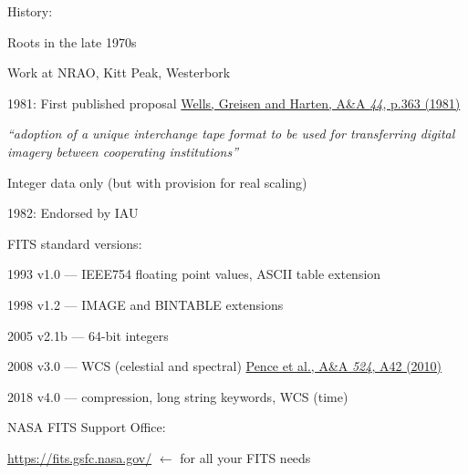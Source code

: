 \documentclass[20pt,landscape]{foils}
\newcommand{\bhref}[2]{\href{#1}{{\color{blue}#2}}}
\newcommand{\burl}[1]{{\color{blue}\url{#1}}}
\begin{document}
\begin{list0}
  \item History:
  \begin{list2big}
    \item Roots in the late 1970s
    \begin{list3}
      \item Work at NRAO, Kitt Peak, Westerbork
    \end{list3}
    \item 1981: First published proposal
          \bhref{https://ui.adsabs.harvard.edu/abs/1981A&AS...44..363W}
                {Wells, Greisen and Harten, A{\&}A {\sl 44}, p.363 (1981)}
    \begin{list3}
      \item {\sl
             ``adoption of a unique interchange tape format to be used for
               transferring digital imagery between cooperating institutions''}
      \item Integer data only (but with provision for real scaling)
    \end{list3}
    \item 1982: Endorsed by IAU
    \item FITS standard versions:
    \begin{list3}
       \item[1993] v1.0 --- IEEE754 floating point values, ASCII table extension
       \item[1998] v1.2 --- IMAGE and BINTABLE extensions
       \item[2005] v2.1b --- 64-bit integers
       \item[2008] v3.0 --- WCS (celestial and spectral)
                   \bhref{https://doi.org/10.1051/0004-6361/201015362}
                         {Pence et al., A\&A {\sl 524}, A42 (2010)}
       \item[2018] v4.0 --- compression, long string keywords, WCS (time)
    \end{list3}
  \end{list2big}
  \item NASA FITS Support Office:
  \begin{list2big}
    \item[] \burl{https://fits.gsfc.nasa.gov/}
            \hspace*{2em}
            {\color{darkgrey} $\longleftarrow$ for all your FITS needs}
  \end{list2big}
\end{list0}

\vspace*{-0.5cm}
\end{document}
